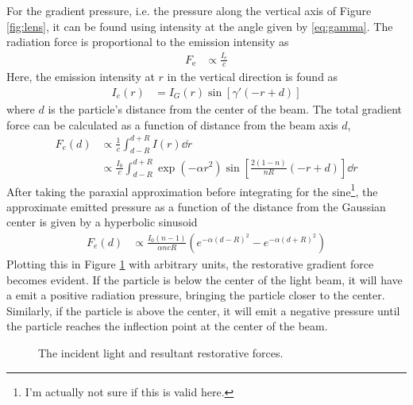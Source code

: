 \documentclass{article}
\begin{document}
	For the gradient pressure, i.e. the pressure along the vertical axis of Figure \ref{fig:lens}, it can be found using intensity at the angle given by \eqref{eq:gamma}. The radiation force is proportional to the emission intensity as \begin{align*}
		F_\mathrm{e} & \propto \frac{ I_e }{c}
	\end{align*}
	Here, the emission intensity at $r$ in the vertical direction is found as \begin{align*}
		I_e (r) & = I_G(r) \sin[\gamma'(-r + d)] %
	\end{align*}
	where $d$ is the particle's distance from the center of the beam.
	The total gradient force can be calculated as a function of distance from the beam axis $d$, \begin{align*}
		F_e(d) & \propto \frac{1}{c}\int_{d - R}^{d + R} I(r) \dd{r} \\
			& \propto \frac{ I_0 }{c} \int_{d - R}^{d+R} \exp(-\alpha r^2) \sin\left[ \frac{2(1-n)}{nR} (-r + d) \right] \dd{r}
	\end{align*}
	After taking the paraxial approximation before integrating for the sine\footnote{I'm actually not sure if this is valid here. }, the approximate emitted pressure as a function of the distance from the Gaussian center is given by a hyperbolic sinusoid \begin{align*}
		F_e(d) & \propto \frac{I_0 (n-1)}{\alpha n c R} \left(e^{-\alpha(d-R)^2} - e^{-\alpha(d+R)^2}\right)
	\end{align*}
	Plotting this in Figure \ref{fig:plot} with arbitrary units, the restorative gradient force becomes evident. If the particle is below the center of the light beam, it will have a emit a positive radiation pressure, bringing the particle closer to the center. Similarly, if the particle is above the center, it will emit a negative pressure until the particle reaches the inflection point at the center of the beam.
		
	\begin{figure}[H]
		\centering
		\caption{The incident light and resultant restorative forces.}
		\label{fig:plot}
	\end{figure}
\end{document}

